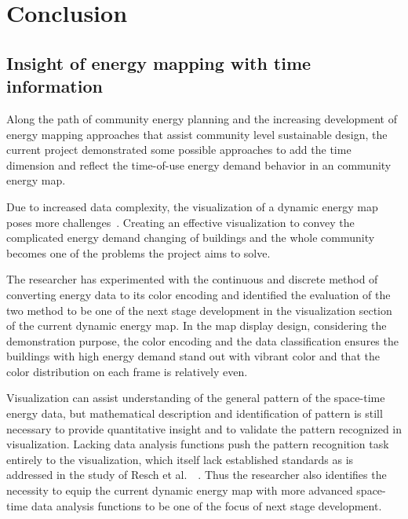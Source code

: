 
\chapter{Conclusion} %

\label{Chapter8} %


\section{Insight of energy mapping with time information}
Along the path of community energy planning and the increasing
development of energy mapping approaches that assist community level
sustainable design, the current project demonstrated some possible
approaches to add the time dimension and reflect the time-of-use
energy demand behavior in an community energy map.

Due to increased data complexity, the visualization of a dynamic
energy map poses more challenges~\cite{Dorling1992}. Creating an
effective visualization to convey the complicated energy demand
changing of buildings and the whole community becomes one of the
problems the project aims to solve.

The researcher has experimented with the continuous and discrete
method of converting energy data to its color encoding and identified
the evaluation of the two method to be one of the next stage
development in the visualization section of the current dynamic energy
map. In the map display design, considering the demonstration purpose,
the color encoding and the data classification ensures the buildings
with high energy demand stand out with vibrant color and that the
color distribution on each frame is relatively even.

Visualization can assist understanding of the general pattern of the
space-time energy data, but mathematical description and
identification of pattern is still necessary to provide quantitative
insight and to validate the pattern recognized in
visualization. Lacking data analysis functions push the pattern
recognition task entirely to the visualization, which itself lack
established standards as is addressed in the study of Resch et al.\
~\cite{Resch2014}. Thus the researcher also identifies the necessity
to equip the current dynamic energy map with more advanced space-time
data analysis functions to be one of the focus of next stage
development.

